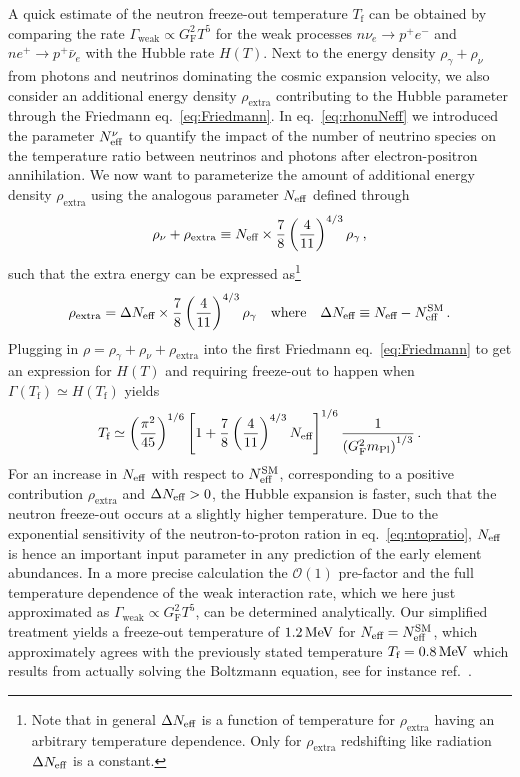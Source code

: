 A quick estimate of the neutron freeze-out temperature $T_\text{f}$ can be obtained by comparing the rate $\Gamma_\text{weak} \propto G_\text{F}^2 T^5$ for the weak processes  $n\nu_e \rightarrow p^+e^-$ and $n e^+ \rightarrow p^+ \bar{\nu}_e$ with the Hubble rate $H(T)$. Next to the energy density $\rho_\gamma + \rho_\nu$ from photons and neutrinos dominating the cosmic expansion velocity, we also consider an additional energy density $\rho_\text{extra}$ contributing to the Hubble  parameter through the Friedmann eq.~\eqref{eq:Friedmann}.  In eq.~\eqref{eq:rhonuNeff} we introduced the parameter $N_\text{eff}^\nu$ to quantify the impact of the number of neutrino species on the temperature ratio between neutrinos and photons after electron-positron annihilation. We now want to parameterize the amount of additional energy density $\rho_\text{extra}$ using the analogous parameter $N_{\text{eff}}$ defined through
\begin{align}
	\rho_\nu + \rho_\text{extra} \equiv N_\text{eff} \times \frac{7}{8} \left( \frac{4}{11} \right)^{4/3} \rho_\gamma \, , 
\end{align}
such that the extra energy can be expressed as\footnote{Note that in general $\Delta N_\text{eff} $ is a function of temperature for $\rho_\text{extra}$ having an arbitrary temperature dependence. Only for  $\rho_\text{extra}$ redshifting like radiation $\Delta N_\text{eff} $ is a constant.}
\begin{align}
	\rho_\text{extra} = \Delta N_\text{eff}  \times  \frac{7}{8} \left( \frac{4}{11} \right)^{4/3}  \rho_\gamma  \quad \text{where} \quad \Delta N_\text{eff}  \equiv N_\text{eff} - N_\text{eff}^\text{SM} \, . \label{eq:DNeff}
\end{align}
Plugging in $\rho = \rho_\gamma + \rho_\nu + \rho_\text{extra}$ into the first Friedmann eq.~\eqref{eq:Friedmann} to get an expression for $H(T)$ and requiring freeze-out to happen when $\Gamma(T_\text{f}) \simeq H(T_\text{f})$ yields
\begin{align}
	T_\text{f} \simeq \left( \frac{\pi^2}{45} \right)^{1/6} \left[ 1 + \frac{7}{8} \left( \frac{4}{11} \right)^{4/3} N_\text{eff}  \right]^{1/6} \frac{1}{\left( G_\text{F}^2 m_\text{Pl} \right)^{1/3}} \, .
\end{align}
For an increase in $N_\text{eff}$ with respect to $N_\text{eff}^\text{SM}$, corresponding to a positive contribution $\rho_\text{extra}$ and $\Delta N_\text{eff}  > 0$, the Hubble expansion is faster, such that the neutron freeze-out occurs at a slightly higher temperature. Due to the exponential sensitivity of the neutron-to-proton ration in eq.~\eqref{eq:ntopratio}, $N_\text{eff}$ is hence an important input parameter in any prediction of the early element abundances. In a more  precise calculation the $\mathcal{O}(1)$ pre-factor and the full temperature dependence of the weak interaction rate, which we here just approximated as $\Gamma_\text{weak} \propto G_\text{F}^2 T^5$, can be determined analytically. Our simplified treatment yields a freeze-out temperature of $1.2 \, \text{MeV}$ for $N_\text{eff} = N_\text{eff}^\text{SM}$, which approximately agrees with the previously stated temperature $T_\text{f} = 0.8 \, \text{MeV}$ which results from actually solving the Boltzmann equation, see for instance ref.~\cite{Baumann:2022mni}.

